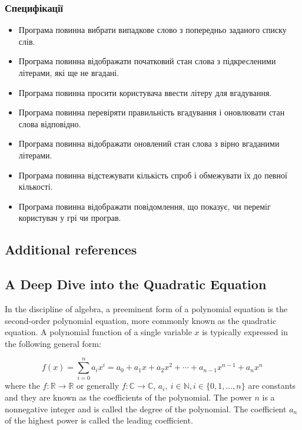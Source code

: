 \documentclass[12pt]{article}
\begin{document}
\subsubsection{Специфікації}
\begin{itemize}
\item Програма повинна вибрати випадкове слово з попередньо заданого списку слів.
\item Програма повинна відображати початковий стан слова з підкресленими літерами, які ще не вгадані.
\item Програма повинна просити користувача ввести літеру для вгадування.
\item Програма повинна перевіряти правильність вгадування і оновлювати стан слова відповідно.
\item Програма повинна відображати оновлений стан слова з вірно вгаданими літерами.
\item Програма повинна відстежувати кількість спроб і обмежувати їх до певної кількості.
\item Програма повинна відображати повідомлення, що показує, чи переміг користувач у грі чи програв.
\end{itemize}
\newpage









\subsection{Additional references}

\subsection{A Deep Dive into the Quadratic Equation}

In the discipline of algebra, a preeminent form of a polynomial equation is the second-order polynomial equation, more commonly known as the quadratic equation. A polynomial function of a single variable $x$ is typically expressed in the following general form:

\begin{equation}
f(x) = \sum_{i=0}^{n} a_ix^i = a_0 + a_1x + a_2x^2 + \cdots + a_{n-1}x^{n-1} + a_nx^n \,
\end{equation}
where the $f: \mathbb{R} \rightarrow \mathbb{R}$ or generally $f: \mathbb{C} \rightarrow \mathbb{C}$, $a_i, \ i \in \mathbb{N}, i \in \{0, 1, ..., n \}$ are constants and they are known as the coefficients of the polynomial. The power $n$ is a nonnegative integer and is called the degree of the polynomial. The coefficient $a_n$ of the highest power is called the leading coefficient.
\end{document}
